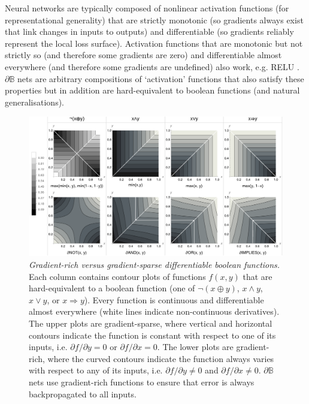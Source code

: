 \documentclass{article} %
\begin{document}
Neural networks are typically composed of nonlinear activation functions (for representational generality) that are strictly monotonic (so gradients always exist that link changes in inputs to outputs) and differentiable (so gradients reliably represent the local loss surface). Activation functions that are monotonic but not strictly so (and therefore some gradients are zero) and differentiable almost everywhere (and therefore some gradients are undefined) also work, e.g. RELU \citep{10.5555/3104322.3104425}. $\partial \mathbb{B}$ nets are arbitrary compositions of `activation' functions that also satisfy these properties but in addition are hard-equivalent to boolean functions (and natural generalisations).

\begin{figure}[t]
	\centering
	\includegraphics[trim=0pt 0pt 0pt 0pt, clip, width=1.0\textwidth]{logic-gates.png}
	\caption{{\em Gradient-rich versus gradient-sparse differentiable boolean functions.} Each column contains contour plots of functions $f(x,y)$ that are hard-equivalent to a boolean function (one of $\neg(x \oplus y)$, $x \wedge y$, $x \vee y$, or $x \Rightarrow y$). Every function is continuous and differentiable almost everywhere (white lines indicate non-continuous derivatives). The upper plots are gradient-sparse, where vertical and horizontal contours indicate the function is constant with respect to one of its inputs, i.e. $\partial f/\partial y = 0$ or $\partial f/\partial x = 0$. The lower plots are gradient-rich, where the curved contours indicate the function always varies with respect to any of its inputs, i.e. $\partial f/\partial y \neq 0$ and $\partial f/\partial x \neq 0$. $\partial \mathbb{B}$ nets use gradient-rich functions to ensure that error is always backpropagated to all inputs.} 
	\label{fig:gradient-rich}
\end{figure}
\end{document}
